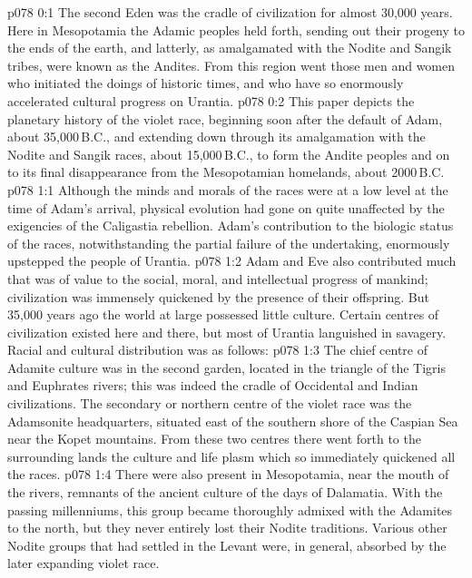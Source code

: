 \author{Archangel}
\vs p078 0:1 The second Eden was the cradle of civilization for almost 30,000 years. Here in Mesopotamia the Adamic peoples held forth, sending out their progeny to the ends of the earth, and latterly, as amalgamated with the Nodite and Sangik tribes, were known as the Andites. From this region went those men and women who initiated the doings of historic times, and who have so enormously accelerated cultural progress on Urantia.
\vs p078 0:2 This paper depicts the planetary history of the violet race, beginning soon after the default of Adam, about 35,000\,B.C., and extending down through its amalgamation with the Nodite and Sangik races, about 15,000\,B.C., to form the Andite peoples and on to its final disappearance from the Mesopotamian homelands, about 2000\,B.C.
\vs p078 1:1 Although the minds and morals of the races were at a low level at the time of Adam’s arrival, physical evolution had gone on quite unaffected by the exigencies of the Caligastia rebellion. Adam’s contribution to the biologic status of the races, notwithstanding the partial failure of the undertaking, enormously upstepped the people of Urantia.
\vs p078 1:2 Adam and Eve also contributed much that was of value to the social, moral, and intellectual progress of mankind; civilization was immensely quickened by the presence of their offspring. But 35,000 years ago the world at large possessed little culture. Certain centres of civilization existed here and there, but most of Urantia languished in savagery. Racial and cultural distribution was as follows:
\vs p078 1:3 \bibnobreakspace {} The chief centre of Adamite culture was in the second garden, located in the triangle of the Tigris and Euphrates rivers; this was indeed the cradle of Occidental and Indian civilizations. The secondary or northern centre of the violet race was the Adamsonite headquarters, situated east of the southern shore of the Caspian Sea near the Kopet mountains. From these two centres there went forth to the surrounding lands the culture and life plasm which so immediately quickened all the races.
\vs p078 1:4 \bibnobreakspace {} There were also present in Mesopotamia, near the mouth of the rivers, remnants of the ancient culture of the days of Dalamatia. With the passing millenniums, this group became thoroughly admixed with the Adamites to the north, but they never entirely lost their Nodite traditions. Various other Nodite groups that had settled in the Levant were, in general, absorbed by the later expanding violet race.
